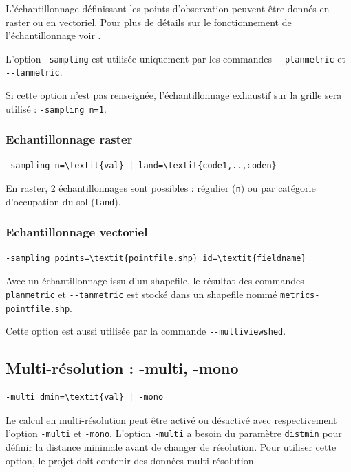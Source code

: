 \documentclass{report}
\begin{document}
L'échantillonnage définissant les points d'observation peuvent être donnés en raster ou en vectoriel. Pour plus de détails sur le fonctionnement de l'échantillonnage voir .

L'option \verb|-sampling| est utilisée uniquement par les commandes \verb|--planmetric| et  \verb|--tanmetric|.

Si cette option n'est pas renseignée, l'échantillonnage exhaustif sur la grille sera utilisé : \verb|-sampling n=1|.

\subsubsection{Echantillonnage raster}
\begin{Verbatim}[commandchars=\\\{\}]
-sampling n=\textit{val} | land=\textit{code1,..,coden}
\end{Verbatim}
En raster, 2 échantillonnages sont possibles : régulier (\verb|n|) ou par catégorie d'occupation du sol (\verb|land|).


\subsubsection{Echantillonnage vectoriel}
\begin{Verbatim}[commandchars=\\\{\}]
-sampling points=\textit{pointfile.shp} id=\textit{fieldname}
\end{Verbatim}
Avec un échantillonnage issu d'un shapefile, le résultat des commandes \verb|--planmetric| et \verb|--tanmetric| est stocké dans un shapefile nommé \verb|metrics-pointfile.shp|.

Cette option est aussi utilisée par la commande \verb|--multiviewshed|.


\subsection{Multi-résolution : -multi, -mono}
\begin{Verbatim}[commandchars=\\\{\}]
-multi dmin=\textit{val} | -mono
\end{Verbatim}

Le calcul en multi-résolution peut être activé ou désactivé avec respectivement l'option \verb|-multi| et \verb|-mono|. 
L'option \verb|-multi| a besoin du paramètre \verb|distmin| pour définir la distance minimale avant de changer de résolution. Pour utiliser cette option, le projet doit contenir des données multi-résolution. 
\end{document}
